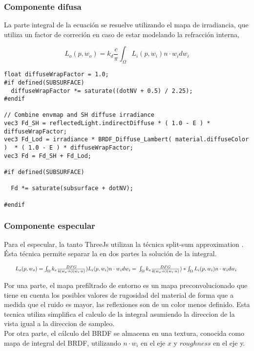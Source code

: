     \subsubsection{Componente difusa}
      La parte integral de la ecuaci\'on se resuelve utilizando el mapa de irradiancia,
      que utiliza un factor de correci\'on en caso de estar modelando la refracci\'on interna,

      $$
      L_o(p, w_o) = k_d \frac{c}{\pi} \int_{\Omega}{L_i(p, w_i) n\cdot{w_i}dw_i}{}
      $$

      \begin{lstlisting}
float diffuseWrapFactor = 1.0;
#if defined(SUBSURFACE)
  diffuseWrapFactor *= saturate((dotNV + 0.5) / 2.25);
#endif

// Combine envmap and SH diffuse irradiance
vec3 Fd_SH = reflectedLight.indirectDiffuse * ( 1.0 - E ) * diffuseWrapFactor;
vec3 Fd_Lod = irradiance * BRDF_Diffuse_Lambert( material.diffuseColor )  * ( 1.0 - E ) * diffuseWrapFactor;
vec3 Fd = Fd_SH + Fd_Lod;

#if defined(SUBSURFACE)

  Fd *= saturate(subsurface + dotNV);

#endif
      \end{lstlisting}
      \singlespacing

    \subsubsection{Componente especular}
    \bgroup
      Para el especular, la tanto ThreeJs utilizan la t\'ecnica split-sum approximation
      \autocite{unreal}. \'Esta t\'ecnica permite separar la en dos partes la soluci\'on de la
      integral.

      \begin{equation}
        \resizebox{0.95\hsize}{!}{%
        $L_o(p, w_o) =
        \int_{\Omega} k_s \frac{DFG}{4(w_o\cdot{n})(w_i\cdot{n})})L_i(p, w_i)n\cdot{w_i}dw_i = \\
        \int_{\Omega} k_s \frac{DFG}{4(w_o\cdot{n})(w_i\cdot{n})}) *
        \int_{\Omega}L_i(p, w_i)n\cdot{w_i}dw_i$   
        }
      \end{equation}
      \singlespacing

      Por una parte, el mapa prefiltrado de entorno es un mapa preconvolucionado que tiene en cuenta
      los posibles valores de rugosidad del material de forma que a medida que el ruido es mayor, las
      reflexiones son de un color menos definido. Esta tecnica utiliza simplifica el calculo de
      la integral asumiendo la direccion de la vista igual a la direccion de sampleo.\\
      Por otra parte, el c\'alculo del BRDF se almacena en una textura, conocida como mapa de integral
      del BRDF, utilizando $n\cdot{w_i}$ en el eje $x$ y $roughness$ en el eje y.

